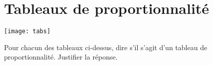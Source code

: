 \section{Tableaux de proportionnalité}

\begin{center}
	\texttt{[image: tabs]}
\end{center}

\begin{questions}
	\question Pour chacun des tableaux ci-dessus, dire s'il s'agit d'un tableau de proportionnalité. Justifier la réponse. 
\end{questions}